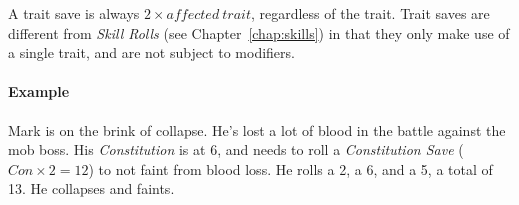 A trait save is always $2 \times \mathit{affected\ trait}$, regardless of the trait.
Trait saves are different from \textit{Skill Rolls} (see Chapter~\ref{chap:skills}) in that they only make use of a single trait, and are not subject to modifiers.

\paragraph{Example} Mark is on the brink of collapse.
He's lost a lot of blood in the battle against the mob boss.
His \textit{Constitution} is at 6, and needs to roll a \textit{Constitution Save} ($Con \times 2 = 12$) to not faint from blood loss.
He rolls a 2, a 6, and a 5, a total of 13. He collapses and faints.
